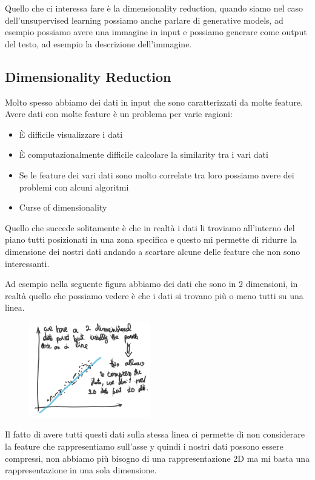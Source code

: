 \documentclass[14pt]{extreport}
\begin{document}
Quello che ci interessa fare è la dimensionality reduction, quando siamo nel caso dell'unsupervised learning possiamo anche parlare di generative
models, ad esempio possiamo avere una immagine in input e possiamo generare come output del testo, ad esempio la descrizione dell'immagine.

\subsection{Dimensionality Reduction}

Molto spesso abbiamo dei dati in input che sono caratterizzati da molte feature. Avere dati con molte feature è un problema per varie ragioni:
\begin{itemize}
	\item È difficile visualizzare i dati
	\item È computazionalmente difficile calcolare la similarity tra i vari dati
	\item Se le feature dei vari dati sono molto correlate tra loro possiamo avere dei problemi con alcuni algoritmi
	\item Curse of dimensionality
\end{itemize}

Quello che succede solitamente è che in realtà i dati li troviamo all'interno del piano tutti posizionati in una zona specifica e questo mi permette
di ridurre la dimensione dei nostri dati andando a scartare alcune delle feature che non sono interessanti.

Ad esempio nella seguente figura abbiamo dei dati che sono in 2 dimensioni, in realtà quello che possiamo vedere è che i dati si trovano più o meno
tutti su una linea.

\begin{figure}[H]
	\centering
	\includegraphics[width=0.4\linewidth]{435.jpeg}
\end{figure}

Il fatto di avere tutti questi dati sulla stessa linea ci permette di non considerare la feature che rappresentiamo sull'asse y quindi i nostri dati
possono essere compressi, non abbiamo più bisogno di una rappresentazione 2D ma mi basta una rappresentazione in una sola dimensione.
\end{document}

